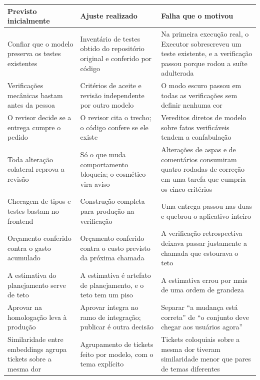 \begin{quadro}[htb]
\centering
\caption{Ajustes motivados pela validação: do previsto ao construído}
\label{quadro:6}
\footnotesize
\renewcommand{\arraystretch}{1.25}
\begin{tabularx}{\textwidth}{|X|X|X|}
\hline
\textbf{Previsto inicialmente} & \textbf{Ajuste realizado} & \textbf{Falha que o motivou} \\
\hline
Confiar que o modelo preserva os testes existentes & Inventário de testes obtido do repositório original e conferido por código & Na primeira execução real, o Executor sobrescreveu um teste existente, e a verificação passou porque rodou a suíte adulterada \\
\hline
Verificações mecânicas bastam antes da pessoa & Critérios de aceite e revisão independente por outro modelo & O modo escuro passou em todas as verificações sem definir nenhuma cor \\
\hline
O revisor decide se a entrega cumpre o pedido & O revisor cita o trecho; o código confere se ele existe & Vereditos diretos de modelo sobre fatos verificáveis tendem a confabulação \\
\hline
Toda alteração colateral reprova a revisão & Só o que muda comportamento bloqueia; o cosmético vira aviso & Alterações de aspas e de comentários consumiram quatro rodadas de correção em uma tarefa que cumpria os cinco critérios \\
\hline
Checagem de tipos e testes bastam no frontend & Construção completa para produção na verificação & Uma entrega passou nas duas e quebrou o aplicativo inteiro \\
\hline
Orçamento conferido contra o gasto acumulado & Orçamento conferido contra o custo previsto da próxima chamada & A verificação retrospectiva deixava passar justamente a chamada que estourava o teto \\
\hline
A estimativa do planejamento serve de teto & A estimativa é artefato de planejamento, e o teto tem um piso & A estimativa errou por mais de uma ordem de grandeza \\
\hline
Aprovar na homologação leva à produção & Aprovar integra no ramo de integração; publicar é outra decisão & Separar ``a mudança está correta'' de ``o conjunto deve chegar aos usuários agora'' \\
\hline
Similaridade entre embeddings agrupa tickets sobre a mesma dor & Agrupamento de tickets feito por modelo, com o tema explícito & Tickets coloquiais sobre a mesma dor tiveram similaridade menor que pares de temas diferentes \\
\hline
\end{tabularx}
\end{quadro}

